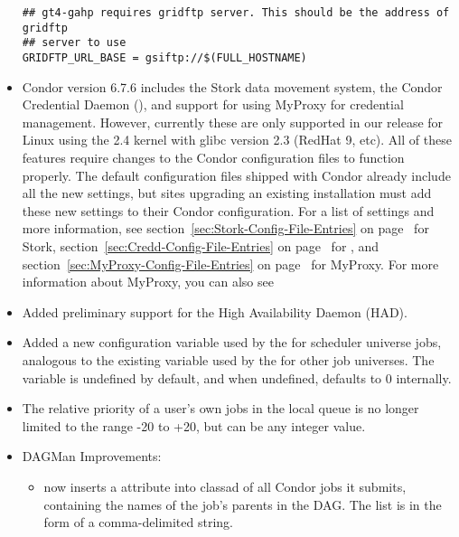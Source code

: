\begin{itemize}
\begin{verbatim}
## gt4-gahp requires gridftp server. This should be the address of gridftp
## server to use
GRIDFTP_URL_BASE = gsiftp://$(FULL_HOSTNAME)
\end{verbatim}

\item Condor version 6.7.6 includes the Stork data movement system, 
  the Condor Credential Daemon (), and support for using
  MyProxy for credential management.
  However, currently these are only supported in our release for Linux
  using the 2.4 kernel with glibc version 2.3 (RedHat 9, etc).
  All of these features require changes to the Condor configuration
  files to function properly.
  The default configuration files shipped with Condor already include
  all the new settings, but sites upgrading an existing installation
  must add these new settings to their Condor configuration.
  For a list of settings and more information, see
  section~\ref{sec:Stork-Config-File-Entries} on 
  page~\pageref{sec:Stork-Config-File-Entries} for Stork,
  section~\ref{sec:Credd-Config-File-Entries} on
  page~\pageref{sec:Credd-Config-File-Entries} for ,
  and section~\ref{sec:MyProxy-Config-File-Entries} on
  page~\pageref{sec:MyProxy-Config-File-Entries} for MyProxy.
  For more information about MyProxy, you can also see  

\item Added preliminary support for the High Availability Daemon (HAD).

\item Added a new 
configuration variable used by the  for scheduler
universe jobs, analogous to the existing
 variable used by the 
for other job universes.  The 
variable is undefined by default, and when undefined, defaults to 0
internally.

\item The relative priority of a user's own jobs in the local
 queue is no longer limited to the range -20 to +20,
but can be any integer value.

\item DAGMan Improvements:

\begin{itemize}

  \item {} now inserts a 
  attribute into classad of all Condor jobs it submits, containing the
  names of the job's parents in the DAG.  The list is in the form of a
  comma-delimited string.


\end{itemize}
\end{itemize}

